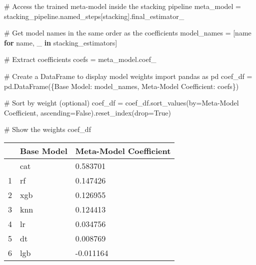 \documentclass[
  letterpaper,
  DIV=11,
  numbers=noendperiod]{scrreprt}
\newenvironment{Shaded}{\begin{snugshade}}{\end{snugshade}}
\newcommand{\CommentTok}[1]{\textcolor[rgb]{0.37,0.37,0.37}{#1}}
\newcommand{\ControlFlowTok}[1]{\textcolor[rgb]{0.00,0.23,0.31}{\textbf{#1}}}
\newcommand{\ImportTok}[1]{\textcolor[rgb]{0.00,0.46,0.62}{#1}}
\newcommand{\KeywordTok}[1]{\textcolor[rgb]{0.00,0.23,0.31}{\textbf{#1}}}
\newcommand{\NormalTok}[1]{\textcolor[rgb]{0.00,0.23,0.31}{#1}}
\newcommand{\OperatorTok}[1]{\textcolor[rgb]{0.37,0.37,0.37}{#1}}
\newcommand{\StringTok}[1]{\textcolor[rgb]{0.13,0.47,0.30}{#1}}
\newcommand{\VariableTok}[1]{\textcolor[rgb]{0.07,0.07,0.07}{#1}}
\begin{document}
\begin{Shaded}
\begin{Highlighting}[]
\CommentTok{\# Access the trained meta{-}model inside the stacking pipeline}
\NormalTok{meta\_model }\OperatorTok{=}\NormalTok{ stacking\_pipeline.named\_steps[}\StringTok{\textquotesingle{}stacking\textquotesingle{}}\NormalTok{].final\_estimator\_}

\CommentTok{\# Get model names in the same order as the coefficients}
\NormalTok{model\_names }\OperatorTok{=}\NormalTok{ [name }\ControlFlowTok{for}\NormalTok{ name, \_ }\KeywordTok{in}\NormalTok{ stacking\_estimators]}

\CommentTok{\# Extract coefficients}
\NormalTok{coefs }\OperatorTok{=}\NormalTok{ meta\_model.coef\_}

\CommentTok{\# Create a DataFrame to display model weights}
\ImportTok{import}\NormalTok{ pandas }\ImportTok{as}\NormalTok{ pd}
\NormalTok{coef\_df }\OperatorTok{=}\NormalTok{ pd.DataFrame(\{}\StringTok{\textquotesingle{}Base Model\textquotesingle{}}\NormalTok{: model\_names, }\StringTok{\textquotesingle{}Meta{-}Model Coefficient\textquotesingle{}}\NormalTok{: coefs\})}

\CommentTok{\# Sort by weight (optional)}
\NormalTok{coef\_df }\OperatorTok{=}\NormalTok{ coef\_df.sort\_values(by}\OperatorTok{=}\StringTok{\textquotesingle{}Meta{-}Model Coefficient\textquotesingle{}}\NormalTok{, ascending}\OperatorTok{=}\VariableTok{False}\NormalTok{).reset\_index(drop}\OperatorTok{=}\VariableTok{True}\NormalTok{)}

\CommentTok{\# Show the weights}
\NormalTok{coef\_df}

\end{Highlighting}
\end{Shaded}

\begin{longtable}[]{@{}lll@{}}
\toprule\noalign{}
& Base Model & Meta-Model Coefficient \\
\midrule\noalign{}
\endhead
\bottomrule\noalign{}
\endlastfoot
0 & cat & 0.583701 \\
1 & rf & 0.147426 \\
2 & xgb & 0.126955 \\
3 & knn & 0.124413 \\
4 & lr & 0.034756 \\
5 & dt & 0.008769 \\
6 & lgb & -0.011164 \\
\end{longtable}
\end{document}

